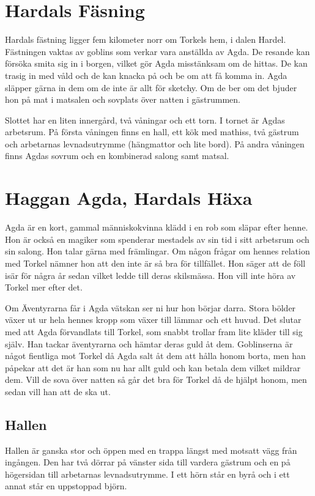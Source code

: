 \section*{Hardals Fäsning}
Hardals fästning ligger fem kilometer norr om Torkels hem, i dalen Hardel. Fästningen vaktas av goblins som verkar vara anställda av Agda. De resande kan försöka smita sig in i borgen, vilket gör Agda misstänksam om de hittas. De kan trasig in med våld och de kan knacka på och be om att få komma in. Agda släpper gärna in dem om de inte är allt för sketchy. Om de ber om det bjuder hon på mat i matsalen och sovplats över natten i gästrummen.

Slottet har en liten innergård, två våningar och ett torn. I tornet är Agdas arbetsrum. På första våningen finns en hall, ett kök med mathiss, två gästrum och arbetarnas levnadsutrymme (hängmattor och lite bord). På andra våningen finns Agdas sovrum och en kombinerad salong samt matsal. 
%
\section*{Haggan Agda, Hardals Häxa}
Agda är en kort, gammal människokvinna klädd i en rob som släpar efter henne. Hon är också en magiker som spenderar mestadels av sin tid i sitt arbetsrum och sin salong. Hon talar gärna med främlingar. Om någon frågar om hennes relation med Torkel nämner hon att den inte är så bra för tillfället. Hon säger att de föll isär för några år sedan vilket ledde till deras skilsmässa. Hon vill inte höra av Torkel mer efter det.

Om Äventyrarna får i Agda vätskan ser ni hur hon börjar darra. Stora bölder växer ut ur hela hennes kropp som växer till lämmar och ett huvud. Det slutar med att Agda förvandlats till Torkel, som snabbt trollar fram lite kläder till sig själv. Han tackar äventyrarna och hämtar deras guld åt dem. Goblinserna är något fientliga mot Torkel då Agda salt åt dem att hålla honom borta, men han påpekar att det är han som nu har allt guld och kan betala dem vilket mildrar dem. Vill de sova över natten så går det bra för Torkel då de hjälpt honom, men sedan vill han att de ska ut. 

\subsection*{Hallen}
Hallen är ganska stor och öppen med en trappa längst med motsatt vägg från ingången. Den har två dörrar på vänster sida till vardera gästrum och en på högersidan till arbetarnas levnadsutrymme. I ett hörn står en byrå och i ett annat står en uppstoppad björn. 


